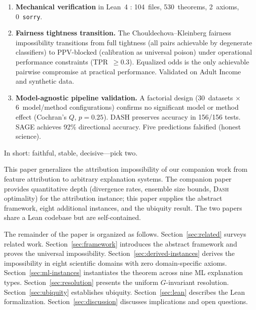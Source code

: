 \documentclass[11pt,a4paper]{article}
\newcommand{\DASH}{\textsc{Dash}}
\begin{document}
\begin{enumerate}[label=(\arabic*)]
    parameter dimension exceeds the observable dimension, covering
    virtually all modern overparameterized models.
  \item \textbf{Mechanical verification} in Lean~4
    \citep{demoura2021lean4}: 104~files, 530~theorems, 2~axioms,
    0~\texttt{sorry}.
  \item \textbf{Fairness tightness transition.}  The
    Chouldechova--Kleinberg fairness impossibility transitions from
    full tightness (all pairs achievable by degenerate classifiers) to
    PPV-blocked (calibration as universal poison) under operational
    performance constraints (TPR~$\geq 0.3$).  Equalized odds is the
    only achievable pairwise compromise at practical performance.
    Validated on Adult Income and synthetic data.
  \item \textbf{Model-agnostic pipeline validation.}  A factorial
    design (30~datasets $\times$ 6~model/method configurations) confirms
    no significant model or method effect (Cochran's $Q$, $p = 0.25$).
    DASH preserves accuracy in 156/156 tests.  SAGE achieves 92\%
    directional accuracy.  Five predictions falsified (honest science).
\end{enumerate}

\noindent In short: faithful, stable, decisive---pick two.

This paper generalizes the attribution impossibility of our companion work
\citep{bilodeau2024impossibility} from feature attribution to arbitrary
explanation systems.  The companion paper provides quantitative depth
(divergence rates, ensemble size bounds, \DASH{} optimality) for the
attribution instance; this paper supplies the abstract framework, eight
additional instances, and the ubiquity result.  The two papers share a
Lean codebase but are self-contained.

The remainder of the paper is organized as follows.
Section~\ref{sec:related} surveys related work.
Section~\ref{sec:framework} introduces the abstract framework and proves
the universal impossibility.
Section~\ref{sec:derived-instances} derives the impossibility in eight
scientific domains with zero domain-specific axioms.
Section~\ref{sec:ml-instances} instantiates the
theorem across nine ML explanation types.
Section~\ref{sec:resolution} presents the
uniform $G$-invariant resolution.  Section~\ref{sec:ubiquity} establishes
ubiquity.  Section~\ref{sec:lean} describes the Lean formalization.
Section~\ref{sec:discussion} discusses implications and open questions.

\end{document}
